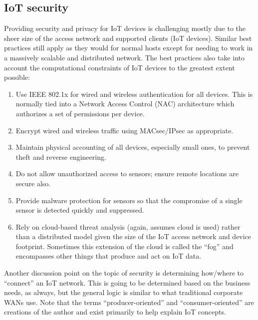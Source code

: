 \subsection{IoT security}
Providing security and privacy for IoT devices is challenging mostly due to
the sheer size of the access network and supported clients (IoT devices).
Similar best practices still apply as they would for normal hosts except for
needing to work in a massively scalable and distributed network. The best
practices also take into account the computational constraints of IoT devices
to the greatest extent possible:

\begin{enumerate}
  \item	Use IEEE 802.1x for wired and wireless authentication for all devices.
  This is normally tied into a Network Access Control (NAC) architecture which
  authorizes a set of permissions per device.
  \item	Encrypt wired and wireless traffic using MACsec/IPsec as appropriate.
  \item	Maintain physical accounting of all devices, especially small ones, to
  prevent theft and reverse engineering.
  \item	Do not allow unauthorized access to sensors; ensure remote locations
  are secure also.
  \item	Provide malware protection for sensors so that the compromise of a
  single sensor is detected quickly and suppressed.
  \item	Rely on cloud-based threat analysis (again, assumes cloud is used)
  rather than a distributed model given the size of the IoT access network and
  device footprint. Sometimes this extension of the cloud is called the
  ``fog'' and encompasses other things that produce and act on IoT data.
\end{enumerate}

Another discussion point on the topic of security is determining how/where to
``connect'' an IoT network. This is going to be determined based on the
business needs, as always, but the general logic is similar to what
traditional corporate WANs use. Note that the terms ``producer-oriented'' and
``consumer-oriented'' are creations of the author and exist primarily to help
explain IoT concepts.

